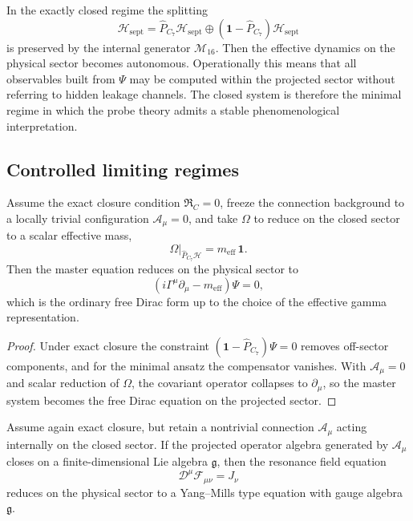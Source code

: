 \begin{remark}
In the exactly closed regime the splitting
\[
 \mathcal H_{\mathrm{sept}}
 = \hat P_{C_7}\mathcal H_{\mathrm{sept}}
 \oplus
 (\mathbf 1-\hat P_{C_7})\mathcal H_{\mathrm{sept}}
\]
is preserved by the internal generator $\mathcal M_{16}$.
Then the effective dynamics on the physical sector becomes autonomous.
Operationally this means that all observables built from $\Psi$ may be
computed within the projected sector without referring to hidden leakage
channels.
The closed system is therefore the minimal regime in which the probe theory
admits a stable phenomenological interpretation.
\end{remark}

\subsection*{Controlled limiting regimes}

\begin{proposition}
\label{prop:dirac-limit}
Assume the exact closure condition $\mathfrak R_C=0$, freeze the connection
background to a locally trivial configuration $\mathcal A_\mu=0$, and take
$\Omega$ to reduce on the closed sector to a scalar effective mass,
\[
 \Omega\big|_{\hat P_{C_7}\mathcal H}
 = m_{\mathrm{eff}}\,\mathbf 1.
\]
Then the master equation reduces on the physical sector to
\[
 (i\Gamma^\mu\partial_\mu - m_{\mathrm{eff}})\Psi = 0,
\]
which is the ordinary free Dirac form up to the choice of the effective
gamma representation.
\end{proposition}

\begin{proof}
Under exact closure the constraint $(\mathbf 1-\hat P_{C_7})\Psi=0$ removes
off-sector components, and for the minimal ansatz the compensator vanishes.
With $\mathcal A_\mu=0$ and scalar reduction of $\Omega$, the covariant
operator collapses to $\partial_\mu$, so the master system becomes the free
Dirac equation on the projected sector.
\end{proof}

\begin{proposition}
\label{prop:yang-mills-limit}
Assume again exact closure, but retain a nontrivial connection
$\mathcal A_\mu$ acting internally on the closed sector.
If the projected operator algebra generated by $\mathcal A_\mu$ closes on a
finite-dimensional Lie algebra $\mathfrak g$, then the resonance field
equation
\[
 \mathcal D^\mu \mathcal F_{\mu\nu}=J_\nu
\]
reduces on the physical sector to a Yang--Mills type equation with gauge
algebra $\mathfrak g$.
\end{proposition}

